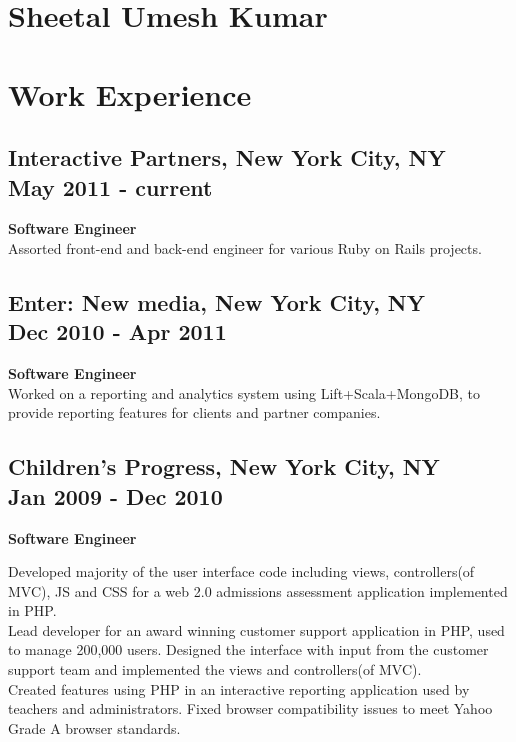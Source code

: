 \documentclass{article}
\begin{document}
\begin{minipage}[t]{3.8in} 
\vspace{-25pt}
\section *{\Huge Sheetal Umesh Kumar} 
\vspace{28pt}
 \section*{Work Experience}   
      \subsection*{Interactive Partners, New York City, NY\\
      May 2011 - current}
      {\bf Software Engineer} \\
      Assorted front-end and back-end engineer for various Ruby on Rails projects.
      
      \subsection*{Enter: New media, New York City, NY \\
      Dec 2010 - Apr 2011}
      {\bf Software Engineer} \\
      Worked on a reporting and analytics system using Lift+Scala+MongoDB, to provide reporting features for clients and partner companies.
      
      \subsection*{Children's Progress, New York City, NY \\
      Jan 2009 - Dec 2010}
      {\bf Software Engineer} 
      
      Developed majority of the user interface code including views, controllers(of MVC), JS and CSS for a web 2.0 admissions assessment application implemented in PHP. \\
      
      Lead developer for an award winning customer support application in PHP, used to manage 200,000 users. Designed the interface with input from the customer support team and implemented the views and controllers(of MVC). \\
      
      Created features using PHP in an interactive reporting application used by teachers and administrators. Fixed browser compatibility issues to meet Yahoo Grade A browser standards. \\
      

\end{minipage}
\end{document}
